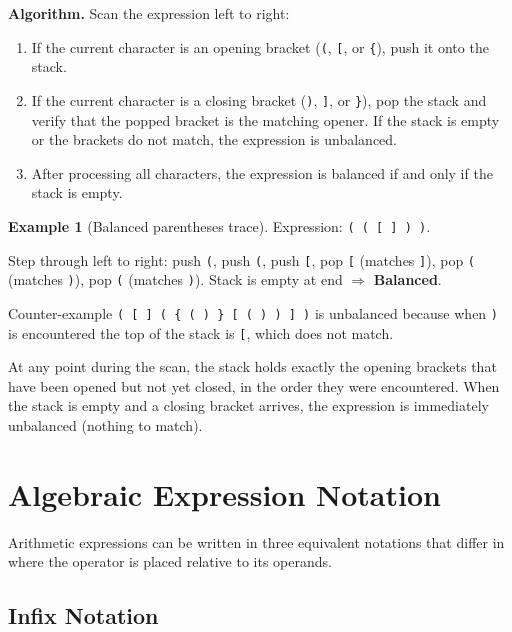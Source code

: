 \documentclass[11pt, a4paper, notitlepage]{report}
\theoremstyle{definition}
\theoremstyle{remark}
\theoremstyle{definition}
\newtheorem{example}[theorem]{Example}
\begin{document}
\textbf{Algorithm.}  Scan the expression left to right:
\begin{enumerate}
  \item If the current character is an opening bracket (\texttt{(}, \texttt{[}, or
        \texttt{\{}), push it onto the stack.
  \item If the current character is a closing bracket (\texttt{)}, \texttt{]}, or
        \texttt{\}}), pop the stack and verify that the popped bracket is the matching
        opener.  If the stack is empty or the brackets do not match, the expression is
        unbalanced.
  \item After processing all characters, the expression is balanced if and only if the
        stack is empty.
\end{enumerate}

\begin{example}[Balanced parentheses trace]
\label{ex:balanced-parens}
Expression: \texttt{( ( [ ] ) )}.

Step through left to right: push \texttt{(}, push \texttt{(}, push \texttt{[}, pop
\texttt{[} (matches \texttt{]}), pop \texttt{(} (matches \texttt{)}), pop \texttt{(}
(matches \texttt{)}).  Stack is empty at end $\Rightarrow$ \textbf{Balanced}.

Counter-example \texttt{( [ ] ( \{ ( ) \} [ ( ) ) ] )} is unbalanced because when
\texttt{)} is encountered the top of the stack is \texttt{[}, which does not match.
\end{example}

\begin{examtip}[title={Exam Tip: Stack Invariant for Bracket Checking}]
At any point during the scan, the stack holds exactly the opening brackets that have been
opened but not yet closed, in the order they were encountered.  When the stack is empty
and a closing bracket arrives, the expression is immediately unbalanced (nothing to match).
\end{examtip}

\section{Algebraic Expression Notation}
\label{sec:expression-notation}

Arithmetic expressions can be written in three equivalent notations that differ in where the
operator is placed relative to its operands.

\subsection{Infix Notation}
\label{subsec:infix}
\end{document}
